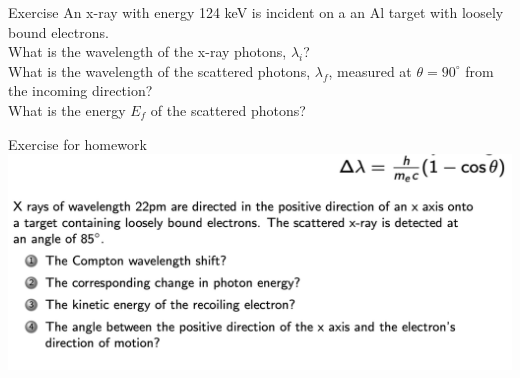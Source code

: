 \begin{frame}{Exercise}
\small
An x-ray with energy 124 keV is incident on a an Al target with loosely bound electrons. \\[4ex]

What is the wavelength of the x-ray photons, $\lambda_i$?\\[4ex]

What is the wavelength of the scattered photons, $\lambda_f$, measured at $\theta = 90^{\circ}$ from the incoming direction?\\[4ex]


What is the energy $E_{f}$ of the scattered photons?\\[4ex]

\end{frame}

\begin{frame}{Exercise for homework}
\small
\includegraphics[scale=0.3]{shift}


\end{frame}


